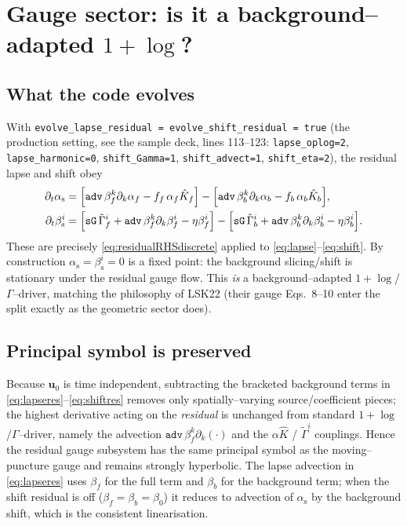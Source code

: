 \documentclass[11pt]{article}
\newcommand{\code}[1]{\texttt{#1}}
\newcommand{\Gamt}{\tilde\Gamma}
\newcommand{\bg}[1]{#1_{0}}
\newcommand{\res}[1]{#1_{\mathrm s}}
\begin{document}
\section{Gauge sector: is it a background--adapted $1+\log$?}
\label{sec:gauge}

\subsection{What the code evolves}
With \code{evolve\_lapse\_residual = evolve\_shift\_residual = true} (the
production setting, see the sample deck, lines 113--123:
\code{lapse\_oplog=2}, \code{lapse\_harmonic=0}, \code{shift\_Gamma=1},
\code{shift\_advect=1}, \code{shift\_eta=2}), the residual lapse and shift obey
\begin{align}
  \partial_t\res\alpha
    &= \Bigl[\code{adv}\,\beta_f^k\partial_k\alpha_f - f_f\,\alpha_f\hat K_f\Bigr]
     - \Bigl[\code{adv}\,\beta_b^k\partial_k\alpha_b - f_b\,\alpha_b\hat K_b\Bigr],
    \label{eq:lapseres}\\
  \partial_t\res\beta^i
    &= \Bigl[\code{sG}\,\Gamt_f^i+\code{adv}\,\beta_f^k\partial_k\beta_f^i-\eta\beta_f^i\Bigr]
     - \Bigl[\code{sG}\,\Gamt_b^i+\code{adv}\,\beta_b^k\partial_k\beta_b^i-\eta\beta_b^i\Bigr].
    \label{eq:shiftres}
\end{align}
These are precisely \eqref{eq:residualRHSdiscrete} applied to
\eqref{eq:lapse}--\eqref{eq:shift}. By construction $\res\alpha=\res\beta^i=0$
is a fixed point: the background slicing/shift is stationary under the residual
gauge flow. This \emph{is} a background--adapted $1+\log$/$\Gamma$--driver,
matching the philosophy of LSK22 (their gauge Eqs.~8--10 enter the split
exactly as the geometric sector does).

\subsection{Principal symbol is preserved}
Because $\bg{\bm u}$ is time independent, subtracting the bracketed background
terms in \eqref{eq:lapseres}--\eqref{eq:shiftres} removes only
spatially--varying source/coefficient pieces; the highest derivative acting on
the \emph{residual} is unchanged from standard $1+\log$/$\Gamma$--driver,
namely the advection $\code{adv}\,\beta_f^k\partial_k(\cdot)$ and the
$\alpha\hat K$ / $\Gamt^i$ couplings. Hence the residual gauge subsystem has
the same principal symbol as the moving--puncture gauge and remains strongly
hyperbolic. The lapse advection in \eqref{eq:lapseres} uses $\beta_f$ for the
full term and $\beta_b$ for the background term; when the shift residual is off
($\beta_f=\beta_b=\bg\beta$) it reduces to advection of $\res\alpha$ by the
background shift, which is the consistent linearisation.
\end{document}
